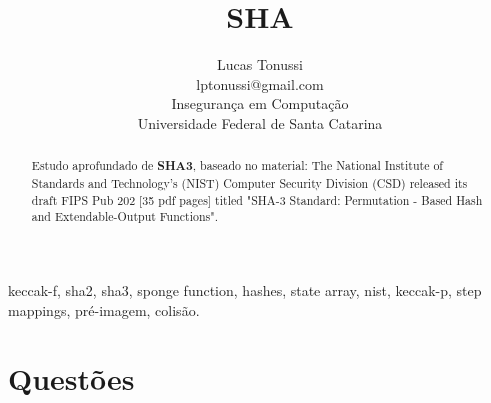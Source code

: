 \documentclass[conference]{IEEEtran}
\title{\LARGE SHA}
\author{Lucas Tonussi\\lptonussi@gmail.com\\Insegurança em 
Computação\\Universidade Federal de Santa Catarina}
\begin{document}
\maketitle

\begin{abstract}
Estudo aprofundado de \textbf{SHA3}, baseado no material: The National Institute
of Standards and Technology's (NIST) Computer Security Division (CSD) released
its draft FIPS Pub 202 [35 pdf pages] titled "SHA-3 Standard: Permutation -
Based Hash and Extendable-Output Functions".
\end{abstract}

\IEEEoverridecommandlockouts

\begin{keywords}
keccak-f, sha2, sha3, sponge function, hashes, state array, nist, keccak-p, 
step mappings, pré-imagem, colisão.
\end{keywords}

\IEEEpeerreviewmaketitle

\section{Questões}
\end{document}
